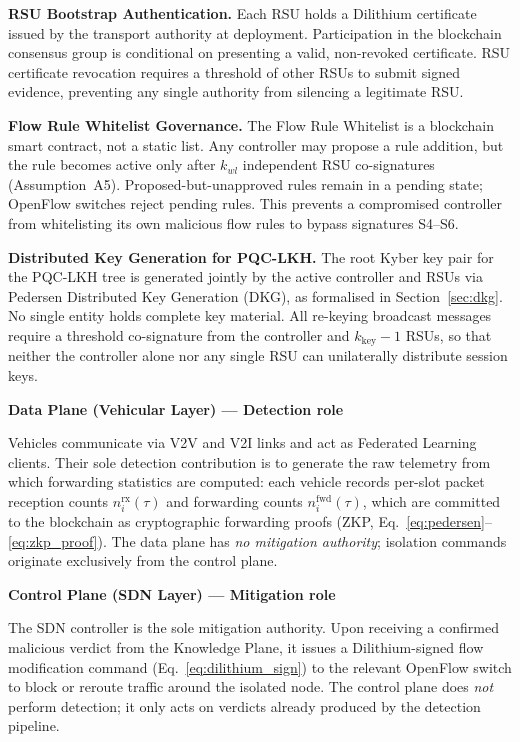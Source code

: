 \documentclass[12pt, a4paper]{report}
\newcommand{\mypar}{\vspace{0.8em}\noindent}
\begin{document}
\mypar
\textbf{RSU Bootstrap Authentication.}
Each RSU holds a Dilithium certificate issued by the transport
authority at deployment. Participation in the blockchain consensus
group is conditional on presenting a valid, non-revoked certificate.
RSU certificate revocation requires a threshold of other RSUs to
submit signed evidence, preventing any single authority from
silencing a legitimate RSU.

\mypar
\textbf{Flow Rule Whitelist Governance.}
The Flow Rule Whitelist is a blockchain smart contract, not a static
list. Any controller may propose a rule addition, but the rule
becomes active only after $k_{wl}$ independent RSU co-signatures
(Assumption~A5). Proposed-but-unapproved rules remain in a pending
state; OpenFlow switches reject pending rules. This prevents a
compromised controller from whitelisting its own malicious flow
rules to bypass signatures S4--S6.

\mypar
\textbf{Distributed Key Generation for PQC-LKH.}
The root Kyber key pair for the PQC-LKH tree is generated jointly
by the active controller and RSUs via Pedersen Distributed Key
Generation (DKG), as formalised in Section~\ref{sec:dkg}. No
single entity holds complete key material. All re-keying broadcast
messages require a threshold co-signature from the controller and
$k_{\text{key}}-1$ RSUs, so that neither the controller alone nor
any single RSU can unilaterally distribute session keys.

\mypar
\textbf{Data Plane (Vehicular Layer) — Detection role}

\mypar
Vehicles communicate via V2V and V2I links and act as Federated Learning clients. Their sole detection contribution is to generate the raw telemetry from which forwarding statistics are computed: each vehicle records per-slot packet reception counts $n_i^{\text{rx}}(\tau)$ and forwarding counts $n_i^{\text{fwd}}(\tau)$, which are committed to the blockchain as cryptographic forwarding proofs (ZKP, Eq.~\eqref{eq:pedersen}--\eqref{eq:zkp_proof}). The data plane has \emph{no mitigation authority}; isolation commands originate exclusively from the control plane.

\mypar
\textbf{Control Plane (SDN Layer) — Mitigation role}

\mypar
The SDN controller is the sole mitigation authority. Upon receiving a confirmed malicious verdict from the Knowledge Plane, it issues a Dilithium-signed flow modification command (Eq.~\eqref{eq:dilithium_sign}) to the relevant OpenFlow switch to block or reroute traffic around the isolated node. The control plane does \emph{not} perform detection; it only acts on verdicts already produced by the detection pipeline.
\end{document}
